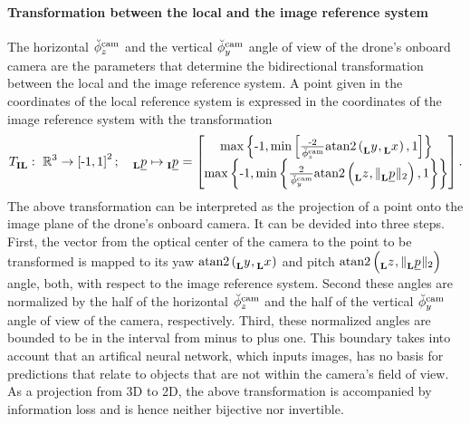 \paragraph*{Transformation between the local and the image reference system} $\ $\\
The horizontal
$\ang[\user]{\camera}{z}{}{}$
and the vertical
$\ang[\user]{\camera}{y}{}{}$
angle of view
of the drone's onboard camera
are the parameters 
that determine the bidirectional transformation 
between the local and the image reference system.
A point given in the coordinates of the local reference system
is expressed in the coordinates of the image reference system with the transformation
\begin{align} \label{equ:local_to_image_transformation}
    \trafo[]{}{\irs\lrs}{}{}
    :\ 
    \mathbb{R}^3 \rightarrow \left[ \text{-}1, 1 \right]^2
    ; \quad
    \pos[]{}{}{\lrs}{} \mapsto \pos[]{}{}{\irs}{}
    =
    \begin{bmatrix}
        \max \left\{ \text -1, \min \left[
            \frac{\text -2}{\ang[\user]{\camera}{z}{}{}}
            \mathrm{atan2}\left( \y[]{}{}{\lrs}{}, \x[]{}{}{\lrs}{} \right), 
            1
        \right] \right\} 
        \\
        \max \left\{ \text -1, \min \left\{
            \frac{2}{\ang[\user]{\camera}{y}{}{}}
            \mathrm{atan2} \left( \z[]{}{}{\lrs}{}, \| \pos[]{}{}{\lrs}{} \|_2 \right), 
            1
        \right\} \right\}
    \end{bmatrix}
    .
\end{align}
The above transformation
can be interpreted as the projection of a point onto the image plane 
of the drone's onboard camera.
It can be devided into three steps.
First, the vector from the optical center of the camera 
to the point to be transformed
is mapped to its yaw
$\mathrm{atan2}\left( \y[]{}{}{\lrs}{}, \x[]{}{}{\lrs}{} \right)$
and pitch 
$\mathrm{atan2} \left( \z[]{}{}{\lrs}{}, \| \pos[]{}{}{\lrs}{} \|_2 \right)$
angle, both, with respect to the image reference system.
Second these angles are normalized by 
the half of the horizontal 
$\ang[\user]{\camera}{z}{}{}$ 
and the half of the vertical
$\ang[\user]{\camera}{y}{}{}$
angle of view of the camera, respectively.
Third, these normalized angles are bounded to be in the interval from minus to plus one.
This boundary takes into account 
that an artifical neural network, which inputs images, 
has no basis for predictions 
that relate to objects that are not within the camera's field of view.
As a projection from 3D to 2D, the above transformation is accompanied by information loss
and is hence neither bijective nor invertible.

